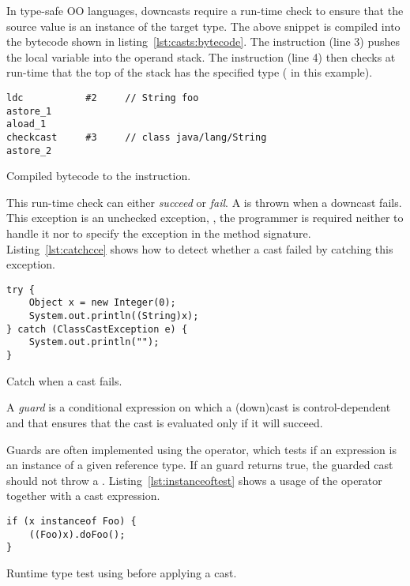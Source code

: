 In type-safe OO languages, downcasts require
a run-time check to ensure that the source value is an instance of the target type.
The above snippet is compiled into the \java{} bytecode shown in listing~\ref{lst:casts:bytecode}.
The  instruction (line 3) pushes the local variable  into the operand stack.
The  instruction (line 4) then checks at run-time that the top of the stack has the specified type ( in this example).

\begin{listing}
\begin{verbatim}	
ldc           #2     // String foo
astore_1
aload_1
checkcast     #3     // class java/lang/String
astore_2
\end{verbatim}	
\caption{Compiled bytecode to the  instruction.}
\label{lst:casts:bytecode}
\end{listing}

This run-time check can either \emph{succeed} or \emph{fail}.
A  is thrown when a downcast fails.
This exception is an unchecked exception, \ie,
the programmer is required neither to handle it
nor to specify the exception in the method signature.
Listing~\ref{lst:catchcce} shows how to detect whether a cast failed by catching this exception.

\begin{listing}
\begin{verbatim}	
try {
	Object x = new Integer(0);
	System.out.println((String)x); 
} catch (ClassCastException e) { 
	System.out.println(""); 
}
\end{verbatim}
\caption{Catch  when a cast fails.}
\label{lst:catchcce}
\end{listing}

A \emph{guard} is a conditional expression on which a (down)cast is control-dependent and that ensures that the cast is evaluated only if it will succeed.

Guards are often implemented using the  operator, which tests
if an expression is an instance of a given reference type.
If an  guard returns true, the guarded cast should not throw
a .
Listing~\ref{lst:instanceoftest} shows a usage of the  operator together with a cast expression.

\begin{listing}
\begin{verbatim}
if (x instanceof Foo) {
	((Foo)x).doFoo();
}
\end{verbatim}
\caption{Runtime type test using  before applying a cast.}
\label{lst:instanceoftest}
\end{listing}

